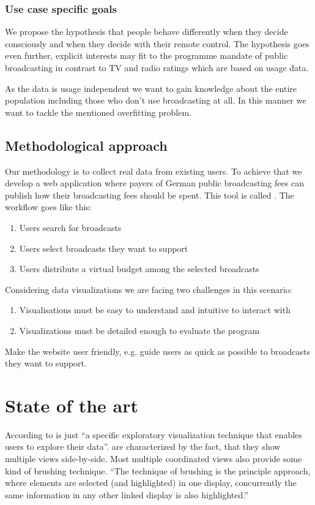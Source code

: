 \documentclass{article}
\begin{document}
\subsubsection{Use case specific goals}
We propose the hypothesis that people behave differently when they decide consciously and when they decide with their remote control.
The hypothesis goes even further, explicit interests may fit to the programme mandate of public broadcasting in contrast to TV and radio ratings which are based on usage data.

As the data is usage independent we want to gain knowledge about the entire population including those who don't use broadcasting at all.
In this manner we want to tackle the mentioned overfitting problem.

\subsection{Methodological approach}
Our methodology is to collect real data from existing users.
To achieve that we develop a web application where payers of German public broadcasting fees can publish how their broadcasting fees should be spent.
This tool is called \rufu{}.
The workflow goes like this:
\begin{enumerate}
\item Users search for broadcasts
\item Users select broadcasts they want to support
\item Users distribute a virtual budget among the selected broadcasts
\end{enumerate}

Considering data visualizations we are facing two challenges in this scenario:
\begin{enumerate}
\item
Visualisations must be easy to understand and intuitive to interact with
\item
Visualizations must be detailed enough to evaluate the program
\end{enumerate}

Make the website user friendly, e.g. guide users as quick as possible to broadcasts they want to support.

\section{State of the art}


According to \textcite{cmv:state_of_the_art} \cmvs{} is just ``a specific exploratory visualization technique that enables users to explore their data''.
\cmvs{} are characterized by the fact, that they show multiple views side-by-side.
Most multiple coordinated views also provide some kind of brushing technique. 
``The technique of brushing is the principle approach, where elements are selected (and highlighted) in one display, concurrently the same information in any other linked display is also highlighted.''\cite{cmv:state_of_the_art}
\end{document}

